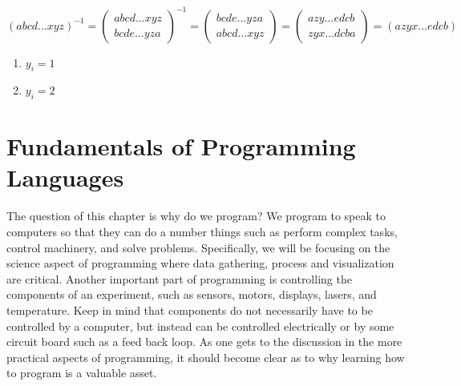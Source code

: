 \documentclass[11pt,a4paper]{book}
\begin{document}
			\begin{equation}
			(abcd...xyz)^{-1}
			=
			\begin{pmatrix}
			abcd...xyz\\
			bcde...yza
			\end{pmatrix}^{-1}
			=
			\begin{pmatrix}
			bcde...yza\\
			abcd...xyz
			\end{pmatrix}
			=
			\begin{pmatrix}
			azy...edcb\\
			zyx...dcba
			\end{pmatrix}
			=(azyx...edcb)		
			\end{equation}
			
			\begin{enumerate}
				\item \(y_i=1\)
				\item \(y_i=2\)
			\end{enumerate}
		
\chapter{Fundamentals of Programming Languages}
	\label{chp:Fundamentals of Recommended Programming Languages}
	The question of this chapter is why do we program? We program to speak to computers so that they can do a number things such as perform complex tasks, control machinery, and solve problems. Specifically, we will be focusing on the science aspect of programming where data gathering, process and visualization are critical. Another important part of programming is controlling the components of an experiment, such as sensors, motors, displays, lasers, and temperature. Keep in mind that components do not necessarily have to be controlled by a computer, but instead can be controlled electrically or by some circuit board such as a feed back loop. As one gets to the discussion in the more practical aspects of programming, it should become clear as to why learning how to program is a valuable asset.
	
\end{document}
